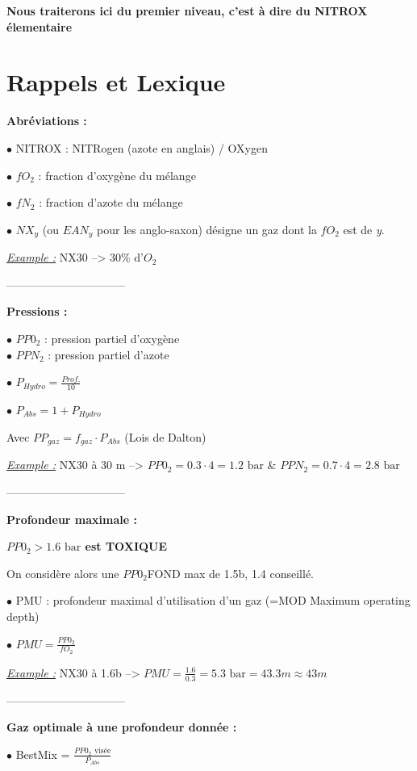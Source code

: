 \documentclass[12pt,a4paper,notitlepage,colorinlistoftodos]{article}
\begin{document}
\textbf{Nous traiterons ici du premier niveau, c'est à dire du NITROX élementaire}

\section{Rappels et Lexique}

\textbf{Abréviations :}

$\bullet$ NITROX : NITRogen (azote en anglais) / OXygen

$\bullet$ $fO_2$ : fraction d'oxygène du mélange

$\bullet$ $fN_2$ : fraction d'azote du mélange

$\bullet$ $NX_{y}$ (ou $EAN_{y}$ pour les anglo-saxon) désigne un gaz dont la $fO_2$ est de \textit{y}. 

\underline{\textit{Example :}} NX30 --> 30\% d'$O_{2}$

--------------------------------

\textbf{Pressions :}

$\bullet$ $PP0_2$ : pression partiel d'oxygène \\
$\bullet$ $PPN_2$ : pression partiel d'azote 

$\bullet$ $P_{Hydro} = \frac{Prof.}{10}$

$\bullet$ $P_{Abs} = 1 + P_{Hydro}$

Avec $PP_{gaz} = f_{gaz} \cdot P_{Abs}$  (Lois de Dalton) 

\underline{\textit{Example :}} NX30 à 30 m --> $PP0_2 = 0.3 \cdot 4 = 1.2 \text{ bar}$  \& $PPN_2 = 0.7 \cdot 4 = 2.8 \text{ bar}$

--------------------------------

\textbf{Profondeur maximale :}

\color{red} \textbf{$PP0_2 > 1.6 \text{ bar}$ est TOXIQUE} \color{black}

On considère alors une $PP0_2$FOND max de 1.5b, 1.4 conseillé.

$\bullet$ PMU : profondeur maximal d'utilisation d'un gaz (=MOD Maximum operating depth) 

$\bullet$ $PMU =  \frac{PP0_2}{fO_2}$ 

\underline{\textit{Example :}} NX30 à 1.6b -->   $PMU =  \frac{1.6}{0.3} = 5.3 \text{ bar} = 43.3 m \approx 43 m$

--------------------------------

\textbf{Gaz optimale à une profondeur donnée :}

$\bullet$ BestMix = $\frac{PP0_2 \text{ visée}}{P_{Abs}}$ 
\end{document}
